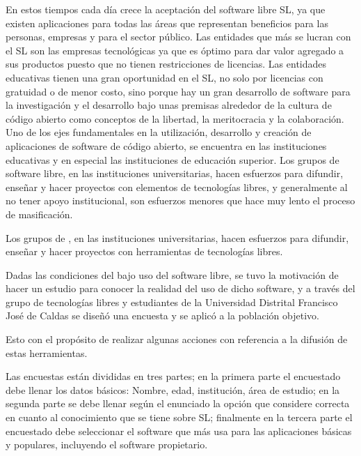 \begin{multicols}{2}
En estos tiempos cada día crece la aceptación del software libre SL, ya que existen aplicaciones para todas las áreas que representan beneficios para las personas, empresas y para el sector público. Las entidades que más se lucran con el SL son las empresas tecnológicas ya que es óptimo para dar valor agregado a sus productos puesto que no tienen restricciones de licencias. Las entidades educativas tienen una gran oportunidad en el SL, no solo por licencias con gratuidad o de menor costo, sino porque hay un gran desarrollo de software para la investigación y el desarrollo bajo unas premisas alrededor de la cultura de código abierto como conceptos de la libertad, la meritocracia y la colaboración.\\

Uno de los ejes fundamentales en la utilización, desarrollo y creación de aplicaciones de software de código abierto, se encuentra en las instituciones educativas y en especial las instituciones de educación superior. Los grupos de software libre, en las instituciones universitarias, hacen esfuerzos para difundir, ense\~nar y hacer proyectos con elementos de tecnologías libres, y generalmente al no tener apoyo institucional, son esfuerzos menores que hace muy lento el proceso de masificación.\\

\begin{entradilla}
Los grupos de {\color{introcolor}{Software Libre}}, en las instituciones universitarias, hacen esfuerzos para difundir, ense\~nar y hacer proyectos con herramientas de tecnologías libres.
\end{entradilla}


Dadas las condiciones del bajo uso del software libre, se tuvo la motivación de hacer un estudio para conocer la realidad del uso de dicho software, y a través del grupo de tecnologías libres y estudiantes de la Universidad Distrital Francisco José de Caldas se dise\~nó una encuesta y se aplicó a la población objetivo. 

Esto con el propósito de realizar algunas acciones con referencia a la difusión de estas herramientas.\\



Las encuestas est\'an divididas en tres partes; en la primera parte el encuestado debe llenar los datos b\'asicos: Nombre, edad, instituci\'on, \'area de estudio; en la segunda parte se debe llenar seg\'un el enunciado la opci\'on que considere correcta en cuanto al conocimiento que se tiene sobre SL; finalmente en la tercera parte el encuestado debe seleccionar el software que m\'as usa para las aplicaciones b\'asicas y populares, incluyendo el software propietario.\\


\end{multicols}
